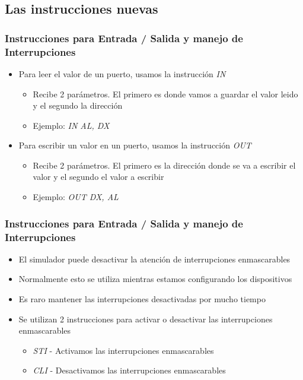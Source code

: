 \documentclass{beamer}
\begin{document}
\subsection{Las instrucciones nuevas}
\begin{frame}
\frametitle{Instrucciones para Entrada / Salida y manejo de Interrupciones}

\begin{itemize}

 \item Para leer el valor de un puerto, usamos la instrucción \emph{IN} 
\begin{itemize}
\item Recibe 2 parámetros. El primero es donde vamos a guardar el valor leido y el segundo la dirección
 \item Ejemplo: \emph{IN AL, DX}
\end{itemize}

 \item Para escribir un valor en un puerto, usamos la instrucción \emph{OUT}
\begin{itemize}
\item Recibe 2 parámetros. El primero es la dirección donde se va a escribir el valor y el segundo el valor a escribir
\item  Ejemplo: \emph{OUT DX, AL}
\end{itemize}
\end{itemize}
\end{frame}

\begin{frame}
\frametitle{Instrucciones para Entrada / Salida y manejo de Interrupciones}

\begin{itemize}

 \item El simulador puede desactivar la atención de interrupciones enmascarables
 \item Normalmente esto se utiliza mientras estamos configurando los dispositivos
 \item Es raro mantener las interrupciones desactivadas por mucho tiempo
 \item Se utilizan 2 instrucciones para activar o desactivar las interrupciones enmascarables 
\begin{itemize}
\item \emph{STI} - Activamos las interrupciones enmascarables
 \item \emph{CLI} - Desactivamos las interrupciones enmascarables
\end{itemize}
\end{itemize}


\end{frame}
\end{document}
